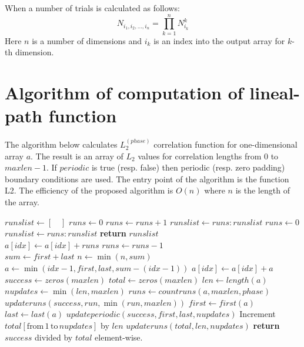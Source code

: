 \documentclass[reprint,amsmath,amssymb,aps,pre,showkeys,showpacs,nofootinbib]{revtex4-1}
\begin{document}
When a number of trials is calculated as follows:
\begin{equation*}
  N_{i_1, i_2, \dots, i_n} = \prod_{k=1}^n N^k_{i_k}
\end{equation*}
Here $n$ is a number of dimensions and $i_k$ is an index into the output array
for $k$-th dimension.

\section{Algorithm of computation of lineal-path function}
\label{linpathalg}
The algorithm below calculates $L_2^{(phase)}$ correlation function for
one-dimensional array $a$. The result is an array of $L_2$ values for
correlation lengths from $0$ to $maxlen-1$. If $periodic$ is true (resp. false)
then periodic (resp. zero padding) boundary conditions are used. The entry point of the
algorithm is the function L2. The efficiency of the proposed algorithm is $O(n)$
where $n$ is the length of the array.

\begin{algorithmic}[1]
    \State $runslist \gets [\quad]$
    \State $runs \gets 0$
        \State $runs \gets runs + 1$
        \State $runslist \gets runs:runslist$
        \State $runs \gets 0$
      \EndIf
    \EndFor
      \State $runslist \gets runs:runslist$
    \EndIf
    \State \textbf{return} $runslist$
  \EndProcedure
  \\
      \State $a[idx] \gets a[idx] + runs$
      \State $runs \gets runs - 1$
    \EndFor
  \EndProcedure
  \\
    \State $sum \gets first + last$
    \State $n \gets \min(n, sum)$
      \State $a \gets \min(idx - 1, first, last, sum - (idx - 1))$
      \State $a[idx] \gets a[idx] + a$
    \EndFor
  \EndProcedure
  \\
    \State $success \gets zeros(maxlen)$
    \State $total \gets zeros(maxlen)$
    \State $len \gets length(a)$
    \State $nupdates \gets \min(len, maxlen)$
    \State $runs \gets countruns(a, maxlen, phase)$
      \State $updateruns(success, run, \min(run, maxlen))$
    \EndFor
      \State $first \gets first(a)$
      \State $last \gets last(a)$
        \State $updateperiodic(success, first, last, nupdates)$
      \EndIf
      \State Increment $total[\text{from} \, 1 \, \text{to} \, nupdates]$ by
      $len$
    \Else
      \State $updateruns(total, len, nupdates)$
    \EndIf
    \State \textbf{return} $success$ divided by $total$ element-wise.  
  \EndProcedure
\end{algorithmic}


\end{document}
